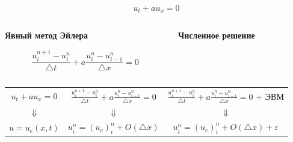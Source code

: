 \documentclass[10pt,xcolor=pst,aspectratio=169]{beamer}
\begin{document}
\begin{frame}{}

    \transdissolve[duration=0.1]
    \justifying
    \large

    \[
        u_{t} + a u_{x} = 0
    \]

    \begin{columns}
        \begin{column}[T]{0.5\textwidth}
            \begin{center}
                \textbf{Явный метод Эйлера}
            \end{center}

            \[
                \frac{u^{n + 1}_{i} - u^{n}_{i}}{\triangle t} + a \frac{u^{n}_{i} - u^{n}_{i - 1}}{\triangle x} = 0
            \]
        \end{column}
        \begin{column}[T]{0.5\textwidth}
            \begin{center}
                \textbf{Численное решение}
            \end{center}
            \begin{center}
                 \begin{center}
                \end{center}
            \end{center}
        \end{column}
    \end{columns}

\end{frame}

\begin{frame}{}

    \transdissolve[duration=0.1]
    \justifying
    \large

    \begin{center}
        \begin{tabular}{|c|c|c|}
            $u_{t} + a u_{x} = 0$
            &
            $\frac{u^{n + 1}_{i} - u^{n}_{i}}{\triangle t} + a \frac{u^{n}_{i} - u^{n}_{i - 1}}{\triangle x} = 0$
            &
            $\frac{u^{n + 1}_{i} - u^{n}_{i}}{\triangle t} + a \frac{u^{n}_{i} - u^{n}_{i - 1}}{\triangle x} = 0$ + ЭВМ
            \\
            $\Downarrow$ & $\Downarrow$ & $\Downarrow$ \\
            $u = u_{e} \left( x, t\right)$ & $u^{n}_{i} = \left( u_{e} \right)^{n}_{i} + \mathit{O} \left( \triangle x \right)$ & $u^{n}_{i} = \left( u_{e} \right)^{n}_{i} + \mathit{O} \left( \triangle x \right) + \varepsilon$ \\
        \end{tabular}
    \end{center}

\end{frame}
\end{document}

